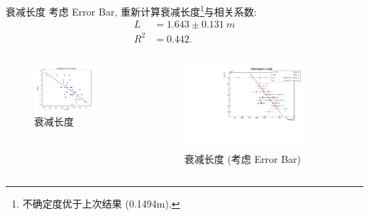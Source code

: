 \documentclass[10pt]{beamer}
\begin{document}
\begin{frame}[label={sec:orga84c383}]{衰减长度}
考虑 Error Bar, 重新计算衰减长度\footnote{不确定度优于上次结果 (0.1494m).}与相关系数:
\begin{align}
\label{eq:3}
L &= 1.643 \pm \qty{0.131}{m} \\
R^2 &= 0.442.
\end{align}

\begin{columns}
\begin{column}{0.5\columnwidth}
\begin{figure}[htbp]
\centering
\includegraphics[width=0.8\textwidth]{../../DetectorPerform/AttenuationLength/figs/Dist.png}
\caption{衰减长度}
\end{figure}
\end{column}

\begin{column}{0.5\columnwidth}
\begin{figure}[htbp]
\centering
\includegraphics[width=0.8\textwidth]{../../DetectorPerform/AttenuationLength/figs/AttenuationLength.pdf}
\caption{衰减长度 (考虑 Error Bar)}
\end{figure}
\end{column}
\end{columns}
\end{frame}
\end{document}
